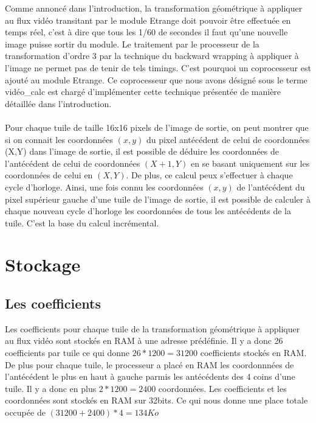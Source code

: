 \documentclass[a4paper,12pt]{report}
\begin{document}
{{                               Comme annoncé dans l'introduction, la transformation géométrique à appliquer au flux vidéo transitant par le module Etrange doit pouvoir être effectuée en temps réel, c'est à dire que tous les 1/60 de secondes il faut qu'une nouvelle image puisse sortir du module. Le traitement par le processeur de la transformation d'ordre 3 par la technique du backward wrapping  à appliquer à l'image ne permet pas de tenir de tels timings. C'est pourquoi un coprocesseur est ajouté au module Etrange. Ce coprocesseur que nous avons désigné sous le terme vidéo\_calc est chargé d'implémenter cette technique présentée de manière détaillée dans l'introduction.
                               \\
                               \\
                               Pour chaque tuile de taille 16x16 pixels de l'image de sortie, on peut montrer que si on connait les coordonnées $(x,y)$ du pixel antécédent de celui de coordonnées (X,Y) dans l'image de sortie, il est possible de déduire les coordonnées de l'antécédent de celui de coordonnées $(X+1,Y)$ en se basant uniquement sur les coordonnées de celui en $(X,Y)$. De plus, ce calcul peux s'effectuer à chaque cycle d'horloge.
                               Ainsi, une fois connu les coordonnées $(x,y)$ de l'antécédent du pixel supérieur gauche d'une tuile de l'image de sortie, il est possible de calculer à chaque nouveau cycle d'horloge les coordonnées de tous les antécédents de la tuile. C'est la base du calcul incrémental.

	                       \section{Stockage}

		               \subsection*{Les coefficients}

                               Les coefficients pour chaque tuile de la transformation géométrique à appliquer au flux vidéo sont stockés en RAM à une adresse prédéfinie. Il y a donc 26 coefficients par tuile
                               ce qui donne $26*1200 = 31200$ coefficients stockés en RAM. De plus pour chaque tuile, le processeur a placé en RAM les coordonnnées de l'antécédent le plus en haut à gauche parmis les antécédents des 4 coins d'une tuile. Il y a donc en plus $2*1200 = 2400$ coordonnées.
                               Les coefficients et les coordonnées sont stockés en RAM sur 32bits. Ce qui nous donne une place totale occupée de $(31200 + 2400)*4 = 134 Ko$

}}
\end{document}
